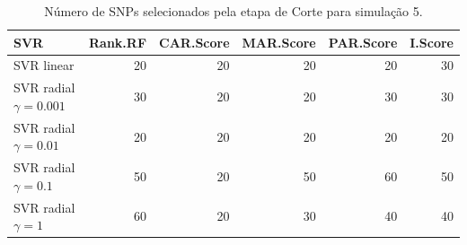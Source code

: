 \begin{table}[ht]
\centering
\begin{tabular}{lrrrrr}
  \hline
SVR & Rank.RF & CAR.Score & MAR.Score & PAR.Score & I.Score \\ 
  \hline
SVR linear & 20 & 20 & 20 & 20 & 30 \\ 
  SVR radial $\gamma = 0.001$ & 30 & 20 & 20 & 30 & 30 \\ 
  SVR radial $\gamma = 0.01$ & 20 & 20 & 20 & 20 & 20 \\ 
  SVR radial $\gamma = 0.1$ & 50 & 20 & 50 & 60 & 50 \\ 
  SVR radial $\gamma = 1$ & 60 & 20 & 30 & 40 & 40 \\ 
   \hline
\end{tabular}
\caption{Número de SNPs selecionados pela etapa de Corte para simulação 5.} 
\end{table}

